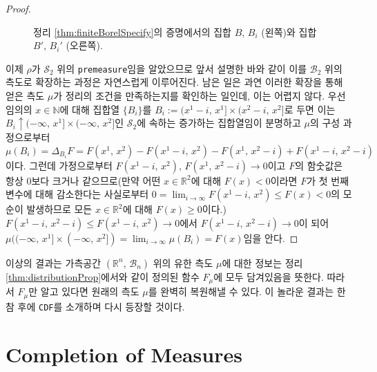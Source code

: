 \begin{proof}
\begin{figure}[!ht]
{
        }
        \caption{정리 \ref{thm:finiteBorelSpecify}의 증명에서의 집합 $B,\,B_i$ (왼쪽)와 집합 $B',\,B_i'$ (오른쪽).}
    \end{figure}

    이제 $\rho$가 $\mathcal{S}_2$ 위의 \texttt{premeasure}임을 알았으므로 앞서 설명한 바와 같이 이를 $\mathcal{B}_2$ 위의 측도로 확장하는 과정은 자연스럽게 이루어진다. 남은 일은 과연 이러한 확장을 통해 얻은 측도 $\mu$가 정리의 조건을 만족하는지를 확인하는 일인데, 이는 어렵지 않다. 우선 임의의 $x\in\mathbb{N}$에 대해  집합열 $\{B_i\}$를 $B_i:=(x^1-i,\,x^1]\times(x^2-i,\,x^2]$로 두면 이는 $B_i\uparrow(-\infty,\,x^1]\times(-\infty,\,x^2]$인 $\mathcal{S}_2$에 속하는 증가하는 집합열임이 분명하고 $\mu$의 구성 과정으로부터 $\mu(B_i)=\Delta_{B_i}F=F(x^1,\,x^2)-F(x^1-i,\,x^2)-F(x^1,\,x^2-i)+F(x^1-i,\,x^2-i)$이다. 그런데 가정으로부터 $F(x^1-i,\,x^2),\,F(x^1,\,x^2-i)\to0$이고 $F$의 함숫값은 항상 0보다 크거나 같으므로(만약 어떤 $x\in\mathbb{R}^2$에 대해 $F(x)<0$이라면 $F$가 첫 번째 변수에 대해 감소한다는 사실로부터 $0=\lim_{i\to\infty}F(x^1-i,\,x^2)\leq F(x)<0$의 모순이 발생하므로 모든 $x\in\mathbb{R}^2$에 대해 $F(x)\geq0$이다.) $F(x^1-i,\,x^2-i)\leq F(x^1-i,\,x^2)\to0$에서 $F(x^1-i,\,x^2-i)\to0$이 되어 $\mu((-\infty,\,x^1]\times(-\infty,\,x^2])=\lim_{i\to\infty}\mu(B_i)=F(x)$임을 안다.
\end{proof}

이상의 결과는 가측공간 $(\mathbb{R}^n,\,\mathcal{B}_n)$ 위의 유한 측도 $\mu$에 대한 정보는 정리 \ref{thm:distributionProp}에서와 같이 정의된 함수 $F_\mu$에 모두 담겨있음을 뜻한다. 따라서 $F_\mu$만 알고 있다면 원래의 측도 $\mu$를 완벽히 복원해낼 수 있다. 이 놀라운 결과는 한참 후에 \texttt{CDF}를 소개하며 다시 등장할 것이다.

\section{Completion of Measures}

